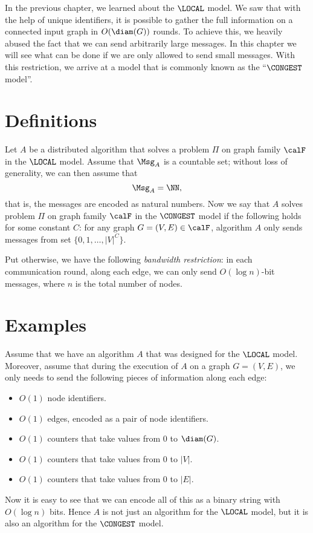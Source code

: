 
In the previous chapter, we learned about the $\LOCAL$ model. We saw that with the help of unique identifiers, it is possible to gather the full information on a connected input graph in $O(\diam(G))$ rounds. To achieve this, we heavily abused the fact that we can send arbitrarily large messages. In this chapter we will see what can be done if we are only allowed to send small messages. With this restriction, we arrive at a model that is commonly known as the ``$\CONGEST$ model''.


\section{Definitions}\label{sec:unique-id}

Let $A$ be a distributed algorithm that solves a problem $\Pi$ on graph family $\calF$ in the $\LOCAL$ model. Assume that $\Msg_A$ is a countable set; without loss of generality, we can then assume that
\[
    \Msg_A = \NN,
\]
that is, the messages are encoded as natural numbers. Now we say that $A$ solves problem $\Pi$ on graph family $\calF$ in the $\CONGEST$ model if the following holds for some constant $C$: for any graph $G = (V,E) \in \calF$, algorithm $A$ only sends messages from set $\{0, 1, \dotsc, |V|^C\}$.

Put otherwise, we have the following \emph{bandwidth restriction}: in each communication round, along each edge, we can only send $O(\log n)$-bit messages, where $n$ is the total number of nodes.


\section{Examples}

Assume that we have an algorithm $A$ that was designed for the $\LOCAL$ model. Moreover, assume that during the execution of $A$ on a graph $G = (V,E)$, we only needs to send the following pieces of information along each edge:
\begin{itemize}[noitemsep]
    \item $O(1)$ node identifiers.
    \item $O(1)$ edges, encoded as a pair of node identifiers.
    \item $O(1)$ counters that take values from $0$ to $\diam(G)$.
    \item $O(1)$ counters that take values from $0$ to $|V|$.
    \item $O(1)$ counters that take values from $0$ to $|E|$.
\end{itemize}
Now it is easy to see that we can encode all of this as a binary string with $O(\log n)$ bits. Hence $A$ is not just an algorithm for the $\LOCAL$ model, but it is also an algorithm for the $\CONGEST$ model.

